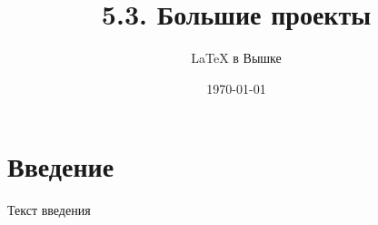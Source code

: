 \documentclass[a4paper,12pt]{article}
\author{\LaTeX{} в Вышке}
\title{5.3. Большие проекты}
\date{\today}
\begin{document}

\maketitle

\tableofcontents

\section*{Введение}

Текст введения




\end{document}
